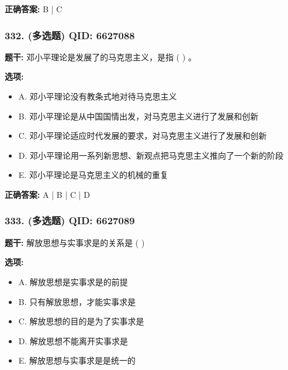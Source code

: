 \documentclass[12pt,UTF8]{ctexart}
\begin{document}
\textbf{正确答案:}
B | C

\vspace{0.3em}\hrulefill\vspace{0.7em}

\subsubsection*{332. (多选题) \small QID: 6627088}

\textbf{题干:}
邓小平理论是发展了的马克思主义，是指  ( )  。

\textbf{选项:}
\begin{itemize}[leftmargin=*]

  \item A. 邓小平理论没有教条式地对待马克思主义

  \item B. 邓小平理论是从中国国情出发，对马克思主义进行了发展和创新

  \item C. 邓小平理论适应时代发展的要求，对马克思主义进行了发展和创新

  \item D. 邓小平理论用一系列新思想、新观点把马克思主义推向了一个新的阶段

  \item E. 邓小平理论是马克思主义的机械的重复

\end{itemize}

\textbf{正确答案:}
A | B | C | D

\vspace{0.3em}\hrulefill\vspace{0.7em}

\subsubsection*{333. (多选题) \small QID: 6627089}

\textbf{题干:}
解放思想与实事求是的关系是 ( )

\textbf{选项:}
\begin{itemize}[leftmargin=*]

  \item A. 解放思想是实事求是的前提

  \item B. 只有解放思想，才能实事求是

  \item C. 解放思想的目的是为了实事求是

  \item D. 解放思想不能离开实事求是

  \item E. 解放思想与实事求是是统一的

\end{itemize}
\end{document}
